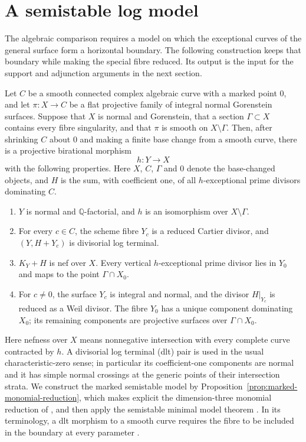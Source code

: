 \section{A semistable log model}\label{sec:log-model}

The algebraic comparison requires a model on which the exceptional curves
of the general surface form a horizontal boundary.  The following construction
keeps that boundary while making the special fibre reduced.  Its output is the
input for the support and adjunction arguments in the next section.

\begin{proposition}\label{prop:log-model}
Let $C$ be a smooth connected complex algebraic curve with a marked point $0$,
and let $\pi:X\to C$ be a flat projective family of integral normal Gorenstein
surfaces.  Suppose that $X$ is normal and Gorenstein, that a section
$\Gamma\subset X$ contains every fibre singularity, and that $\pi$ is smooth
on $X\setminus\Gamma$.  Then, after shrinking $C$ about $0$ and making a
finite base change from a smooth curve, there is a projective birational
morphism
\[
 h:Y\longrightarrow X
\]
with the following properties.  Here $X$, $C$, $\Gamma$ and $0$ denote the
base-changed objects, and $H$ is the sum, with coefficient one, of all
$h$-exceptional prime divisors dominating $C$.
\begin{enumerate}
\item $Y$ is normal and $\mathbb Q$-factorial, and $h$ is an isomorphism
      over $X\setminus\Gamma$.
\item For every $c\in C$, the scheme fibre $Y_c$ is a reduced Cartier divisor,
      and $(Y,H+Y_c)$ is divisorial log terminal.
\item $K_Y+H$ is nef over $X$.  Every vertical $h$-exceptional prime divisor
      lies in $Y_0$ and maps to the point $\Gamma\cap X_0$.
\item For $c\ne0$, the surface $Y_c$ is integral and normal, and the divisor
      $H|_{Y_c}$ is reduced as a Weil divisor.  The fibre $Y_0$ has a unique component dominating
      $X_0$; its remaining components are projective surfaces over
      $\Gamma\cap X_0$.
\end{enumerate}
\end{proposition}

Here nefness over $X$ means nonnegative intersection with every complete curve
contracted by $h$.  A divisorial log terminal (dlt) pair is used in the usual
characteristic-zero sense; in particular its coefficient-one components are
normal and it has simple normal crossings at the generic points of their
intersection strata.  We construct the marked semistable model by
Proposition~\ref{prop:marked-monomial-reduction}, which makes explicit the
dimension-three monomial reduction of
\cite[Theorems~7.17 and~7.19]{KM1998}, and then apply the semistable minimal
model theorem \cite[Theorem~7.9]{KM1998}.  In its terminology, a dlt morphism
to a smooth curve requires the fibre to be included in the boundary at every
parameter \cite[Definition~7.1]{KM1998}.

